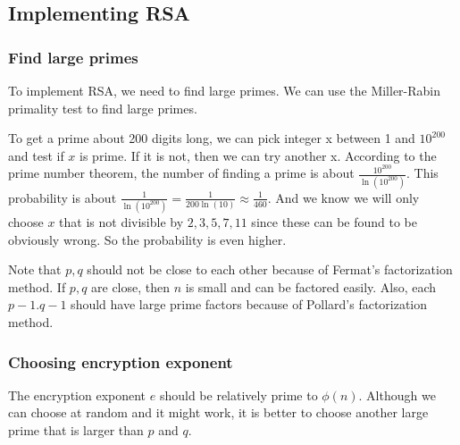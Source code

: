 \documentclass[letterpaper,12pt,oneside]{article}
\begin{document}
\subsection{Implementing RSA}
\subsubsection{Find large primes}
To implement RSA, we need to find large primes. We can use the Miller-Rabin primality test to find large primes.

To get a prime about 200 digits long, we can pick integer x between 1 and $10^{200}$ and test if $x$ is prime. If it is not, then we can try another x. According to the prime number theorem, the number of finding a prime is about $\frac{10^{200}}{\ln (10^{200})}$. This probability is about $\frac{1}{\ln(10^{200})}=\frac{1}{200\ln(10)}\approx \frac{1}{460}$. And we know we will only choose $x$ that is not divisible by $2,3,5,7,11$ since these can be found to be obviously wrong. So the probability is even higher.

Note that $p,q$ should not be close to each other because of Fermat's factorization method. If $p,q$ are close, then $n$ is small and can be factored easily. Also, each $p-1. q-1$ should have large prime factors because of Pollard's factorization method.
\subsubsection{Choosing encryption exponent}
The encryption exponent $e$ should be relatively prime to $\phi(n)$. Although we can choose at random and it might work, it is better to choose another large prime that is larger than $p$ and $q$.
\end{document}
